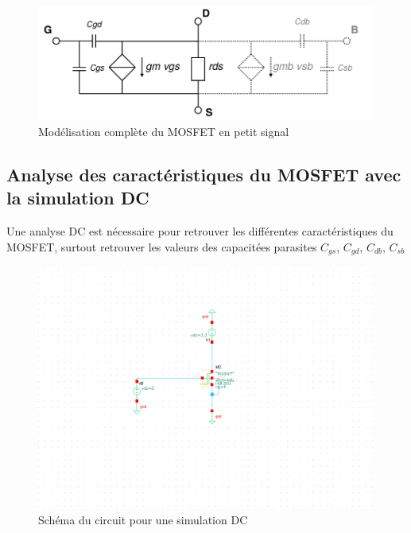 \documentclass[a4paper]{article}
\begin{document}
\begin{figure}[!htb]
\begin{center}
  \includegraphics[scale=0.47]{complete-model.png}
  \caption{Mod\'elisation compl\`ete du MOSFET en petit signal\cite{conception-circuits-integrees}}
\end{center}
\end{figure}

\subsection{Analyse des caract\'eristiques du MOSFET avec la simulation DC}

Une analyse DC est n\'ecessaire pour retrouver les diff\'erentes caract\'eristiques du MOSFET,
surtout retrouver les valeurs des capacit\'ees parasites $C_{gs}$, $C_{gd}$, $C_{db}$, $C_{sb}$

\begin{figure}[!htb]
\begin{center}
  \includegraphics[scale=0.40]{arch-transistor.png}
  \caption{Sch\'ema du circuit pour une simulation DC}
\end{center}
\end{figure}
\end{document}
